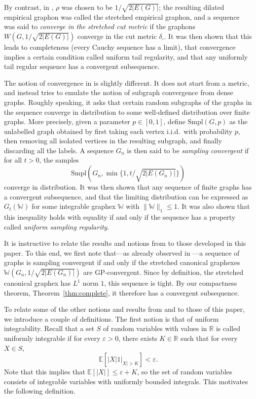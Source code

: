 \documentclass{amsart}
\numberwithin{equation}{section}
\numberwithin{figure}{section}
\theoremstyle{definition}
\theoremstyle{remark}
\newcommand{\eps}{\varepsilon}
\newcommand{\EE}{\mathbb{E}}
\newcommand{\RR}{\mathbb{R}}
\newcommand{\cW}{\mathbb{W}}
\begin{document}
By contrast, in \cite{BCCH16}, $\rho$ was chosen to be $1/\sqrt{2|E(G)|}$;
the resulting dilated empirical graphon was called the stretched empirical
graphon, and a sequence was said to \emph{converge in the stretched cut
metric} if the graphons $W(G,1/\sqrt{2|E(G)|})$ converge in the cut metric
$\delta_\square$. It was then shown that this leads to completeness (every
Cauchy sequence has a limit), that convergence implies a certain condition
called uniform tail regularity, and that any uniformly tail regular sequence
has a convergent subsequence.

The notion of convergence in \cite{BCCV17} is slightly different. It does not
start from a metric, and instead tries to emulate the notion of subgraph
convergence from dense graphs. Roughly speaking, it asks that certain random
subgraphs of the graphs in the sequence converge in distribution to some
well-defined distribution over finite graphs. More precisely, given a
parameter $p\in [0,1]$, define $\text{Smpl}(G,p)$ as the unlabelled graph
obtained by first taking each vertex i.i.d.\ with probability $p$, then
removing all isolated vertices in the resulting subgraph, and finally
discarding all the labels. A sequence $G_n$ is then said to be \emph{sampling
convergent} if for all $t>0$, the samples
\[\text{Smpl}(G_n,\min\{1,t/\sqrt{2|E(G_n)|}\})\]
converge in distribution. It was then shown that any sequence of finite
graphs has a convergent subsequence, and that the limiting distribution can
be expressed as $G_t(\cW)$ for some integrable graphex $\cW$ with
$\|\cW\|_1\leq 1$. It was also shown that this inequality holds with equality
if and only if the sequence has a property called \emph{uniform sampling
regularity}.

It is instructive to relate the results and notions from \cite{BCCV17} to
those developed in this paper. To this end, we first note that---as already
observed in \cite{BCCV17}---a sequence of graphs is sampling convergent if
and only if the stretched canonical graphexes $\cW(G_n,1/\sqrt{2|E(G_n)|})$
are GP-convergent. Since by definition, the stretched canonical graphex has
$L^1$ norm $1$, this sequence is tight. By our compactness theorem,
Theorem~\ref{thm:complete}, it therefore has a convergent subsequence.

To relate some of the other notions and results from \cite{BCCH16} and
\cite{BCCV17} to those of this paper, we introduce a couple of definitions.
The first notion is that of uniform integrability. Recall that a set $S$ of
random variables with values in $\RR$ is called uniformly integrable if for
every $\eps>0$, there exists $K \in \RR$ such that for every $X \in S$,
\[\EE[|X|1|_{X|>K}]<\eps
.\] Note that this implies that $\EE[|X|] \le \eps+K$, so the set of random
variables consists of integrable variables with uniformly bounded integrals.
This motivates the following definition.
\end{document}
